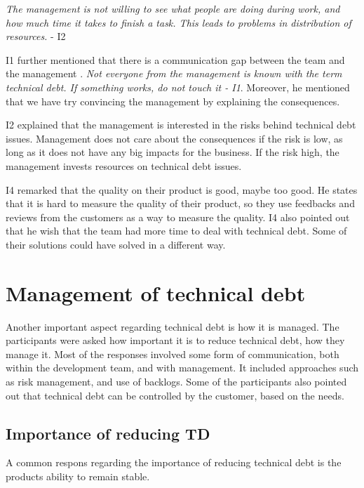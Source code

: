 \begin{displayquote}
\textit{The management is not willing to see what people are doing during work, and how much time it takes to finish a task. This leads to problems in distribution of resources.} - I2
\end{displayquote}

I1 further mentioned that there is a communication gap between the team and the management . \textit{Not everyone from the management is known with the term technical debt. If something works, do not touch it - I1}. Moreover, he mentioned that we have try convincing the management by explaining the consequences.


I2 explained that the management is interested in the risks behind technical debt issues. Management does not care about the consequences if the risk is low, as long as it does not have any big impacts for the business. If the risk high, the management invests resources on technical debt issues. 

I4 remarked that the quality on their product is good, maybe too good. He states that it is hard to measure the quality of their product, so they use feedbacks and reviews from the customers as a way to measure the quality. I4 also pointed out that he wish that the team had more time to deal with technical debt. Some of their solutions could have solved in a different way.










\section{Management of technical debt}
\label{sec:managing}
Another important aspect regarding technical debt is how it is managed. The participants were asked how important it is to reduce technical debt, how they manage it. Most of the responses involved some form of communication, both within the development team, and with management. It included approaches such as risk management, and use of backlogs. Some of the participants also pointed out that technical debt can be controlled by the customer, based on the needs.

\subsection{Importance of reducing TD}
A common respons regarding the importance of reducing technical debt is the products ability to remain stable.

